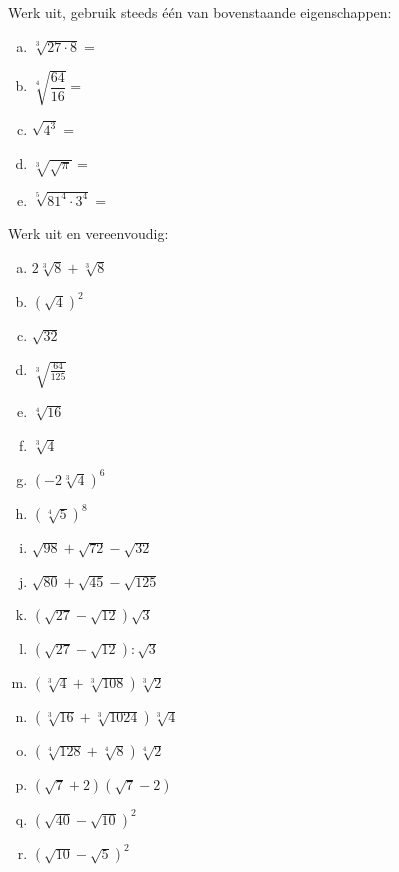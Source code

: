 \documentclass[12pt,twoside]{article}
\begin{document}
\begin{oefening}
Werk uit, gebruik steeds één van bovenstaande eigenschappen:
\begin{enumerate}[(a)]
  \itemsep1em
  \item $\sqrt[3]{27\cdot 8}=$\arulefill
  \item $\sqrt[4]{\dfrac{64}{16}}=$\arulefill
  \item $\sqrt{4^3}=$\arulefill
  \item $\sqrt[3]{\sqrt{\pi}}=$\arulefill
  \item $\sqrt[5]{81^4\cdot 3^4}=$\arulefill
\end{enumerate}
\end{oefening}

\begin{oefening}
Werk uit en vereenvoudig:
\begin{multicols}{3}
\begin{enumerate}[(a)]
  \itemsep1em
  \item $2\sqrt[3]{8}+\sqrt[3]{8}$
  \item $\left(\sqrt{4}\right)^2$
  \item $\sqrt{32}$
  \item $\sqrt[3]{\frac{64}{125}}$
  \item $\sqrt[4]{16}$
  \item $\sqrt[3]{4}$
  \item $\left(-2\sqrt[3]{4}\right)^6$
  \item $\left(\sqrt[4]{5}\right)^8$
  \item $\sqrt{98}+\sqrt{72}-\sqrt{32}$
  \item $\sqrt{80}+\sqrt{45}-\sqrt{125}$
  \item $\left(\sqrt{27}-\sqrt{12}\right)\sqrt{3}$
  \item $\left(\sqrt{27}-\sqrt{12}\right):\sqrt{3}$
  \item $\left(\sqrt[3]{4}+\sqrt[3]{108}\right)\sqrt[3]{2}$
  \item $\left(\sqrt[3]{16}+\sqrt[3]{1024}\right)\sqrt[3]{4}$
  \item $\left(\sqrt[4]{128}+\sqrt[4]{8}\right)\sqrt[4]{2}$
  \item $\left(\sqrt{7}+2\right)\left(\sqrt{7}-2\right)$
  \item $\left(\sqrt{40}-\sqrt{10}\right)^2$
  \item $\left(\sqrt{10}-\sqrt{5}\right)^2$
\end{enumerate}
\end{multicols}
\end{oefening}
\end{document}

